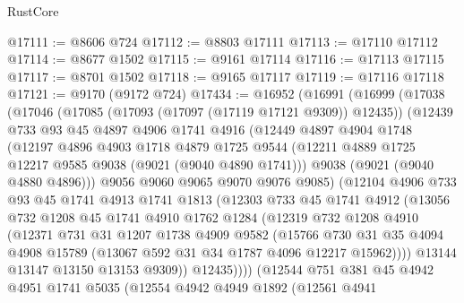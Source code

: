\begin{lexlean}{RustCore}
\begin{coremodule}
@17111 := @8606 @724
@17112 := @8803 @17111
@17113 := @17110 @17112
@17114 := @8677 @1502
@17115 := @9161 @17114
@17116 := @17113 @17115
@17117 := @8701 @1502
@17118 := @9165 @17117
@17119 := @17116 @17118
@17121 := @9170 (@9172 @724)
@17434 := @16952
    (@16991
      (@16999
        (@17038
          (@17046
            (@17085 (@17093 (@17097 (@17119 @17121 @9309)) @12435))
            (@12439
              @733
              @93
              @45
              @4897
              @4906
              @1741
              @4916
              (@12449
                @4897
                @4904
                @1748
                (@12197
                  @4896
                  @4903
                  @1718
                  @4879
                  @1725
                  @9544
                  (@12211 @4889 @1725 @12217 @9585 @9038 (@9021 (@9040 @4890 @1741)))
                  @9038
                  (@9021 (@9040 @4880 @4896)))
                @9056
                @9060
                @9065
                @9070
                @9076
                @9085)
              (@12104
                @4906
                @733
                @93
                @45
                @1741
                @4913
                @1741
                @1813
                (@12303
                  @733
                  @45
                  @1741
                  @4912
                  (@13056
                    @732
                    @1208
                    @45
                    @1741
                    @4910
                    @1762
                    @1284
                    (@12319
                      @732
                      @1208
                      @4910
                      (@12371
                        @731
                        @31
                        @1207
                        @1738
                        @4909
                        @9582
                        (@15766
                          @730
                          @31
                          @35
                          @4094
                          @4908
                          @15789
                          (@13067 @592 @31 @34 @1787 @4096 @12217 @15962))))
                    @13144
                    @13147
                    @13150
                    @13153
                    @9309))
                @12435))))
        (@12544
          @751
          @381
          @45
          @4942
          @4951
          @1741
          @5035
          (@12554
            @4942
            @4949
            @1892
            (@12561
              @4941

\end{coremodule}
\end{lexlean}
